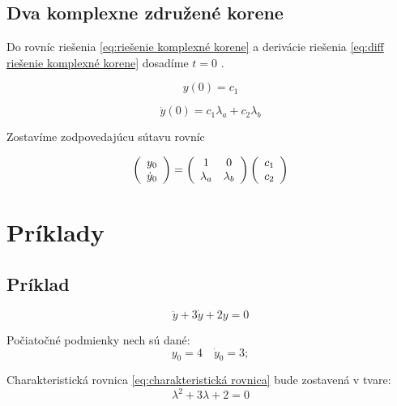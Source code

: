\documentclass[a4paper,10pt]{article}
\begin{document}
\subsection{Dva komplexne združené korene}

Do rovníc riešenia \eqref{eq:riešenie komplexné korene} a derivácie riešenia \eqref{eq:diff riešenie komplexné korene} dosadíme $t=0$ .

\begin{equation}
	y(0)=c_1
\end{equation}
	
\begin{equation}
	\dot{y}(0)=c_1\lambda_a+c_2\lambda_b
\end{equation}

Zostavíme zodpovedajúcu sútavu rovníc

\begin{equation}
\label{eq: sústava pre komplexné korene}
	\left(\begin{array}{c}
		y_0\\
		\dot{y}_0\\
	\end{array}\right)=
	\left(\begin{array}{c c}
	 	1 & 0 \\
	 	\lambda_a & \lambda_b \\
	\end{array}\right)
	\left(\begin{array}{c}
		c_1\\
		c_2\\
	\end{array}\right)
\end{equation}



\section{Príklady}

\subsection{Príklad}
\begin{equation*}
\ddot{y}+3\dot{y}+2y=0 
\end{equation*}

Počiatočné podmienky nech sú dané:
\begin{equation*}
	y_0=4\quad \dot{y}_0=3;
\end{equation*}

Charakteristická rovnica \eqref{eq:charakteristická rovnica} bude zostavená v tvare:
\begin{equation*}
\lambda^2+3\lambda+2=0
\end{equation*}
\end{document}
